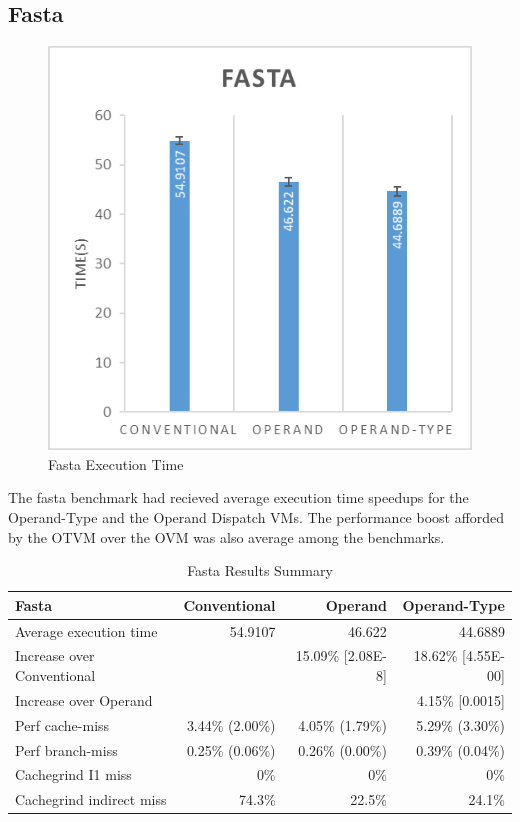 \documentclass[english,a4paper,12pt]{report}
\begin{document}
\subsection{Fasta}

\begin{figure}[!htb]
  \centering
  \includegraphics{fasta.png}
  \caption{Fasta Execution Time}
  \label{fig:fasta-time}
\end{figure}

The fasta benchmark had recieved average execution time speedups for
the Operand-Type and the Operand Dispatch VMs. The performance boost
afforded by the OTVM over the OVM was also average among the
benchmarks.

\begin{table}[!htb]
  \begin{center}
    \begin{tabular}{lrrr}
      Fasta & Conventional & Operand & Operand-Type\\
      \hline
      Average execution time & 54.9107 & 46.622 & 44.6889\\
      Increase over Conventional &  & 15.09\% [2.08E-8] & 18.62\% [4.55E-00]\\
      Increase over Operand &  &  & 4.15\% [0.0015]\\
      Perf cache-miss & 3.44\% (2.00\%) & 4.05\% (1.79\%) & 5.29\% (3.30\%)\\
      Perf branch-miss & 0.25\% (0.06\%) & 0.26\% (0.00\%) & 0.39\% (0.04\%)\\
      Cachegrind I1 miss & 0\% & 0\% & 0\%\\
      Cachegrind indirect miss & 74.3\% & 22.5\% & 24.1\%\\
    \end{tabular}
  \end{center}
  \caption{Fasta Results Summary}
\end{table}
\end{document}
